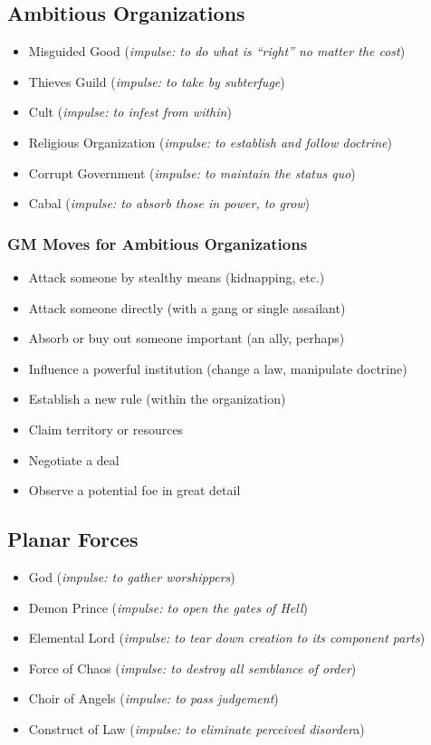 \subsection{Ambitious Organizations}
\begin{itemize}
\item Misguided Good (\emph{impulse: to do what is ``right'' no matter the cost})
\item Thieves Guild (\emph{impulse: to take by subterfuge})
\item Cult (\emph{impulse: to infest from within})
\item Religious Organization (\emph{impulse: to establish and follow doctrine})
\item Corrupt Government (\emph{impulse: to maintain the status quo})
\item Cabal (\emph{impulse: to absorb those in power, to grow})

\end{itemize}
\subsubsection{GM Moves for Ambitious Organizations}
\begin{itemize}
\item Attack someone by stealthy means (kidnapping, etc.)
\item Attack someone directly (with a gang or single assailant)
\item Absorb or buy out someone important (an ally, perhaps)
\item Influence a powerful institution (change a law, manipulate doctrine)
\item Establish a new rule (within the organization)
\item Claim territory or resources
\item Negotiate a deal
\item Observe a potential foe in great detail

\end{itemize}
\subsection{Planar Forces}
\begin{itemize}
\item God (\emph{impulse: to gather worshippers})
\item Demon Prince (\emph{impulse: to open the gates of Hell})
\item Elemental Lord (\emph{impulse: to tear down creation to its component parts})
\item Force of Chaos (\emph{impulse: to destroy all semblance of order})
\item Choir of Angels (\emph{impulse: to pass judgement})
\item Construct of Law (\emph{impulse: to eliminate perceived disorder}a)

\end{itemize}
